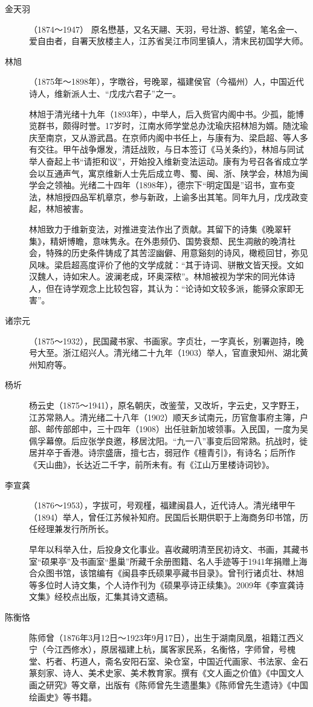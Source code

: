 \begin{description}
  \item[金天羽] （1874～1947） 原名懋基，又名天翮、天羽，号壮游、鹤望，笔名金一、爱自由者，自署天放楼主人，江苏省吴江市同里镇人，清末民初国学大师。
  \item[林旭] （1875年～1898年），字暾谷，号晚翠，福建侯官（今福州）人，中国近代诗人，维新派人士、“戊戌六君子”之一。\par
        林旭于清光绪十九年（1893年），中举人，后入赀官内阁中书。少孤，能博览群书，颇得时誉。17岁时，江南水师学堂总办沈瑜庆招林旭为婿。随沈瑜庆至南京，又从游武昌。在京师内阁中书任上，与康有为、梁启超、等人多有交往。甲午战争爆发，清廷战败，与日本签订《马关条约》，林旭与同试举人奋起上书“请拒和议”，开始投入维新变法运动。康有为号召各省成立学会以互通声气，寓京维新人士先后成立粤、蜀、闽、浙、陕学会，林旭为闽学会之领袖。光绪二十四年（1898年），德宗下“明定国是”诏书，宣布变法，林旭授四品军机章京，参与新政，上谕多出其笔。同年九月，戊戌政变起，林旭被害。\par
        林旭致力于维新变法，对推进变法作出了贡献。其留下的诗集《晚翠轩集》，精妍博瞻，意味隽永。在外患频仍、国势衰颓、民生凋敝的晚清社会，特殊的历史条件铸成了其苦涩幽僻、用意谿刻的诗风，橄榄回甘，弥见风味。梁启超高度评价了他的文学成就：“其于诗词、骈散文皆天授。文如汉魏人，诗如宋人。波澜老成，环奥深秾”。林旭被视为学宋的同光体诗人，但在诗学观念上比较包容，其认为：“论诗如文较多派，能驿众家即无害”。
  \item[诸宗元] （1875～1932），民国藏书家、书画家。字贞壮，一字真长，别署迦持，晚号大至。浙江绍兴人。清光绪二十九年（1903）举人，官直隶知州、湖北黄州知府等。
  \item[杨圻] 杨云史（1875～1941），原名朝庆，改鉴莹，又改圻，字云史，又字野王，江苏常熟人。清光绪二十八年（1902）顺天乡试南元，历官詹事府主簿，户部、邮传部郎中，三十四年（1908）出任驻新加坡领事。入民国，一度为吴佩孚幕僚。后应张学良邀，移居沈阳。“九一八”事变后回常熟。抗战时，徙居并卒于香港。诗宗盛唐，擅七古，弱冠作《檀青引》，有诗名；后所作《天山曲》，长达近二千字，前所未有。有《江山万里楼诗词钞》。
  \item[李宣龚] （1876～1953），字拔可，号观槿，福建闽县人，近代诗人。清光绪甲午（1894）举人，曾任江苏候补知府。民国后长期供职于上海商务印书馆，历任经理兼发行所所长。\par
        早年以科举入仕，后投身文化事业。喜收藏明清至民初诗文、书画，其藏书室“硕果亭”及书画室“墨巢”所藏千余册图籍、名人手迹等于1941年捐赠上海合众图书馆，该馆编有《闽县李氏硕果亭藏书目录》。曾刊行诸贞壮、林旭等多位时人诗文集，个人诗作刊为《硕果亭诗正续集》。2009年《李宣龚诗文集》经校点出版，汇集其诗文遗稿。
  \item[陈衡恪] 陈师曾（1876年3月12日～1923年9月17日），出生于湖南凤凰，祖籍江西义宁（今江西修水），原居福建上杭，属客家民系，名衡恪，字师曾，号槐堂、朽者、朽道人，斋名安阳石室、染仓室，中国近代画家、书法家、金石篆刻家、诗人、美术史家、美术教育家。撰有《文人画之价值》《中国文人画之研究》等文章，出版有《陈师曾先生遗墨集》《陈师曾先生遗诗》《中国绘画史》等书籍。\par

\end{description}
